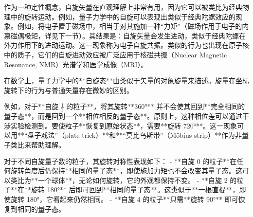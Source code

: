 作为一种定性概念，自旋矢量在直观理解上非常有用，因为它可以被类比为经典物理中的旋转运动。例如，量子力学中的自旋可以表现出类似于经典陀螺效应的现象。例如，将电子置于磁场中，相当于对其施加一种“力矩”（磁场作用于电子的内禀磁偶极矩，详见下一节）。其结果是：自旋矢量会发生进动，类似于经典陀螺在外力作用下的进动运动。这一现象称为电子自旋共振。类似的行为也出现在原子核中的质子，它们的自旋进动效应被广泛应用于核磁共振（Nuclear Magnetic Resonance, NMR）光谱学和医学成像（MRI）。

在数学上，量子力学中的**自旋态**由类似于矢量的对象旋量来描述。旋量在坐标旋转下的行为与普通矢量存在微妙的区别。  

例如，对于**自旋 \( \frac{1}{2} \) 的粒子**，将其旋转**360°** 并不会使其回到**完全相同的量子态**，而是回到一个**相位相反的量子态**。原则上，这种相位差可以通过干涉实验检测到。要使粒子**恢复到原始状态**，需要**旋转 720°**。这一现象可以用**“盘子戏法”（plate trick）**和**“莫比乌斯带”（Möbius strip）**作为非量子类比来帮助理解。  

对于不同自旋量子数的粒子，其旋转对称性表现如下：  
- **自旋 0 的粒子**在任何旋转角度后仍保持**相同的量子态**，即使施加力矩也不会改变其量子态。这可以类比为**一个球体**，无论如何旋转，它的外观都保持不变。  
- **自旋 2 的粒子**在**旋转 180°** 后即可回到**相同的量子态**。这类似于**一根直棍**，即使旋转 180°，它看起来仍然相同。  
- **自旋 4 的粒子**只需**旋转 90°** 即可恢复到相同的量子态。